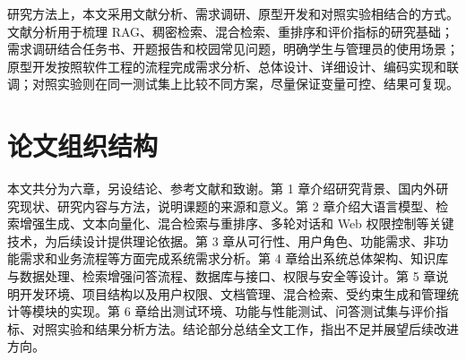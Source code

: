 研究方法上，本文采用文献分析、需求调研、原型开发和对照实验相结合的方式。文献分析用于梳理 RAG、稠密检索、混合检索、重排序和评价指标的研究基础；需求调研结合任务书、开题报告和校园常见问题，明确学生与管理员的使用场景；原型开发按照软件工程的流程完成需求分析、总体设计、详细设计、编码实现和联调；对照实验则在同一测试集上比较不同方案，尽量保证变量可控、结果可复现。

\section{论文组织结构}
\label{sec:organization}

本文共分为六章，另设结论、参考文献和致谢。第 1 章介绍研究背景、国内外研究现状、研究内容与方法，说明课题的来源和意义。第 2 章介绍大语言模型、检索增强生成、文本向量化、混合检索与重排序、多轮对话和 Web 权限控制等关键技术，为后续设计提供理论依据。第 3 章从可行性、用户角色、功能需求、非功能需求和业务流程等方面完成系统需求分析。第 4 章给出系统总体架构、知识库与数据处理、检索增强问答流程、数据库与接口、权限与安全等设计。第 5 章说明开发环境、项目结构以及用户权限、文档管理、混合检索、受约束生成和管理统计等模块的实现。第 6 章给出测试环境、功能与性能测试、问答测试集与评价指标、对照实验和结果分析方法。结论部分总结全文工作，指出不足并展望后续改进方向。
